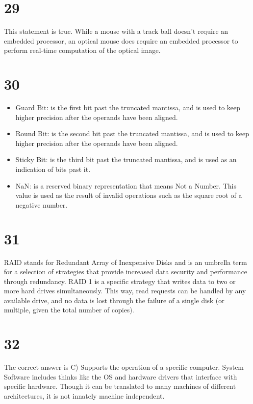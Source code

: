 \documentclass[a4paper,11pt]{article}
\begin{document}
\section*{29}
This statement is true.  While a mouse with a track ball doesn't require an embedded processor, an optical mouse does require an embedded processor to perform real-time computation of the optical image. 


\section*{30}
\begin{itemize}
  \item Guard Bit:  is the first bit past the truncated mantissa, and is used to keep higher precision after the operands have been aligned.
  \item Round Bit: is the second bit past the truncated mantissa, and is used to keep higher precision after the operands have been aligned.
  \item Sticky Bit: is the third bit past the truncated mantissa, and is used as an indication of bits past it.
  \item NaN: is a reserved binary representation that means Not a Number.  This value is used as the result of invalid operations such as the square root of a negative number.
\end{itemize}


\section*{31}
RAID stands for Redundant Array of Inexpensive Disks and is an umbrella term for a selection of strategies that provide increased data security and performance through redundancy.  RAID 1 is a specific strategy that writes data to two or more hard drives simultaneously.  This way, read requests can be handled by any available drive, and no data is lost through the failure of a single disk (or multiple, given the total number of copies).
 

\section*{32}
The correct answer is C) Supports the operation of a specific computer.  System Software includes thinks like the OS and hardware drivers that interface with specific hardware.  Though it can be translated to many machines of different architectures, it is not innately machine independent.  
\end{document}
